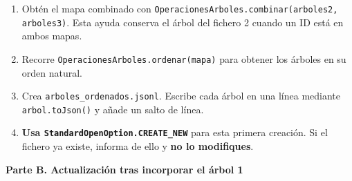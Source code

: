 \documentclass[a4paper,12pt]{article}
\begin{document}
\begin{enumerate}
\item Obtén el mapa combinado con \texttt{O\allowbreak{}p\allowbreak{}e\allowbreak{}r\allowbreak{}a\allowbreak{}c\allowbreak{}i\allowbreak{}o\allowbreak{}n\allowbreak{}e\allowbreak{}s\allowbreak{}A\allowbreak{}r\allowbreak{}b\allowbreak{}o\allowbreak{}l\allowbreak{}e\allowbreak{}s\allowbreak{}.\allowbreak{}c\allowbreak{}o\allowbreak{}m\allowbreak{}b\allowbreak{}i\allowbreak{}n\allowbreak{}a\allowbreak{}r\allowbreak{}(\allowbreak{}a\allowbreak{}r\allowbreak{}b\allowbreak{}o\allowbreak{}l\allowbreak{}e\allowbreak{}s\allowbreak{}2\allowbreak{},\allowbreak{} \allowbreak{}a\allowbreak{}r\allowbreak{}b\allowbreak{}o\allowbreak{}l\allowbreak{}e\allowbreak{}s\allowbreak{}3\allowbreak{})}. Esta ayuda conserva el árbol del fichero 2 cuando un ID está en ambos mapas.
\item Recorre \texttt{O\allowbreak{}p\allowbreak{}e\allowbreak{}r\allowbreak{}a\allowbreak{}c\allowbreak{}i\allowbreak{}o\allowbreak{}n\allowbreak{}e\allowbreak{}s\allowbreak{}A\allowbreak{}r\allowbreak{}b\allowbreak{}o\allowbreak{}l\allowbreak{}e\allowbreak{}s\allowbreak{}.\allowbreak{}o\allowbreak{}r\allowbreak{}d\allowbreak{}e\allowbreak{}n\allowbreak{}a\allowbreak{}r\allowbreak{}(\allowbreak{}m\allowbreak{}a\allowbreak{}p\allowbreak{}a\allowbreak{})} para obtener los árboles en su orden natural.
\item Crea \texttt{a\allowbreak{}r\allowbreak{}b\allowbreak{}o\allowbreak{}l\allowbreak{}e\allowbreak{}s\allowbreak{}\_\allowbreak{}o\allowbreak{}r\allowbreak{}d\allowbreak{}e\allowbreak{}n\allowbreak{}a\allowbreak{}d\allowbreak{}o\allowbreak{}s\allowbreak{}.\allowbreak{}j\allowbreak{}s\allowbreak{}o\allowbreak{}n\allowbreak{}l}. Escribe cada árbol en una línea mediante \texttt{arbol.toJson()} y añade un salto de línea.
\item \textbf{Usa \texttt{S\allowbreak{}t\allowbreak{}a\allowbreak{}n\allowbreak{}d\allowbreak{}a\allowbreak{}r\allowbreak{}d\allowbreak{}O\allowbreak{}p\allowbreak{}e\allowbreak{}n\allowbreak{}O\allowbreak{}p\allowbreak{}t\allowbreak{}i\allowbreak{}o\allowbreak{}n\allowbreak{}.\allowbreak{}C\allowbreak{}R\allowbreak{}E\allowbreak{}A\allowbreak{}T\allowbreak{}E\allowbreak{}\_\allowbreak{}N\allowbreak{}E\allowbreak{}W}} para esta primera creación. Si el fichero ya existe, informa de ello y \textbf{no lo modifiques}.
\end{enumerate}

\textbf{Parte B. Actualización tras incorporar el árbol 1}\par
\end{document}
